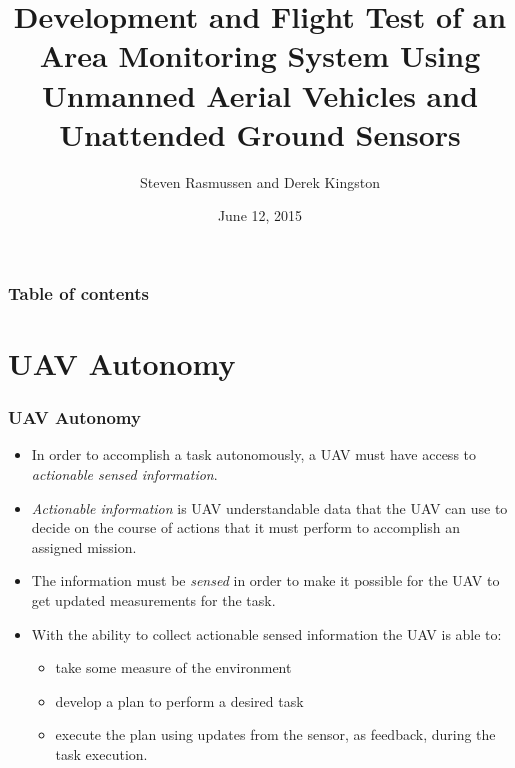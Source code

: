 \documentclass{beamer}
\begin{document}
\title[Area Monitoring using UAV and UGS]{Development and Flight Test of an Area Monitoring System Using Unmanned Aerial Vehicles and Unattended Ground Sensors}  
\author{Steven Rasmussen and Derek Kingston}
\date{June 12, 2015} 


\begin{frame}
\titlepage
\end{frame}

\begin{frame}\frametitle{Table of contents}
\tableofcontents
\end{frame} 

\section{UAV Autonomy} 
\begin{frame}\frametitle{UAV Autonomy} 
\begin{itemize}
\item In order to accomplish a task autonomously, a UAV must have access to \emph{actionable sensed information}.\\
\item  \emph{Actionable information} is UAV understandable data that the UAV can use to decide on the course of actions that it must perform to accomplish an assigned mission. \\
\item The information must be \emph{sensed} in order to make it possible for the UAV to get updated measurements for the task.\\
\item With the ability to collect actionable sensed information the UAV is able to:
\begin{itemize}
\item take some measure of the environment
\item develop a plan to perform a desired task
\item execute the plan using updates from the sensor, as feedback, during the task execution.
\end{itemize}
\end{itemize}
\end{frame}
\end{document}
